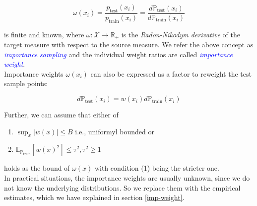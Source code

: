 \begin{equation}
    \omega(x_i) = \frac{p_{\text{test}}(x_i)}{p_{\text{train}}(x_i)} = \frac{d\mathbb{P}_{\text{test}}(x_i)}{d\mathbb{P}_{\text{train}}(x_i)}
    \label{eqn:4.5}
\end{equation}

is finite and known, where $\omega: \mathcal{X} \to \mathbb{R}_+$ is the \emph{Radon-Nikodym derivative} of the target measure with respect to the source measure. We refer the above concept as \textcolor{blue}{\emph{importance sampling}} \citep{fishman1996monte} and the individual weight ratios are called \textcolor{blue}{\emph{importance weight}}.\\

Importance weights $\omega(x_i)$ can also be expressed as a factor to reweight the test sample points:

\begin{equation}
    d\mathbb{P}_{\text{test}}(x_i) = w(x_i)d\mathbb{P}_{\text{train}}(x_i)
    \label{eq:4.6}
\end{equation}

Further, we can assume \citep{ma2022optimally} that either of
\begin{enumerate}
    \item $\sup_x \lvert w(x) \rvert \leq B$ i.e., uniformyl bounded or
    \item $\mathbb{E}_{\mathbb{P}_{\text{train}}}[w(x)^2] \leq \tau^2, \tau^2 \geq 1$
\end{enumerate}
holds as the bound of $\omega(x)$ with condition (1) being the stricter one.\\

In practical situations, the importance weights are usually unknown, since we do not know the underlying distributions. So we replace them with the empirical estimates, which we have explained in section \ref{imp-weight}.

